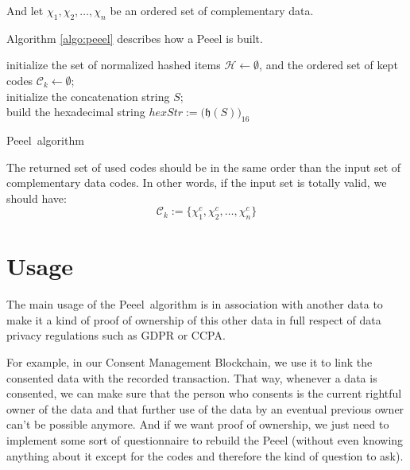 \documentclass[twoside,twocolumn]{article}
\theoremstyle{definition}
\theoremstyle{remark}
\begin{document}
And let $\chi_1, \chi_2, \dots, \chi_n$ be an ordered set of complementary data.

Algorithm \ref{algo:peeel} describes how a Peeel is built.
\begin{algorithm}
    initialize the set of normalized hashed items $\mathcal{H} \gets \emptyset$,
        and the ordered set of kept codes $\mathcal{C}_{k} \gets \emptyset$; \\
    initialize the concatenation string $S$; \\
    build the hexadecimal string $hexStr := \Big( \mathfrak{h}(S) \Big)_{16}$ \\
    \caption{Peeel\texttrademark~algorithm}
    \label{algo:peeel}
\end{algorithm}

The returned set of used codes should be in the same order than the input set of complementary data codes.
In other words, if the input set is totally valid, we should have:$$
    \mathcal{C}_{k} := \{ \chi_1^c, \chi_2^c, \dots, \chi_n^c \}
$$


\section{Usage}

The main usage of the Peeel\texttrademark~algorithm is in association with another data to make it a kind of proof of ownership of this other data 
in full respect of data privacy regulations such as GDPR or CCPA.

For example, in our Consent Management Blockchain\cite{drd2:cyd}, we use it to link the consented data with the recorded transaction.
That way, whenever a data is consented, we can make sure that the person who consents is the current rightful owner of the data and that further use 
of the data by an eventual previous owner can't be possible anymore. And if we want proof of ownership, we just need to implement some sort of 
questionnaire to rebuild the Peeel (without even knowing anything about it except for the codes and therefore the kind of question to ask).
\end{document}
